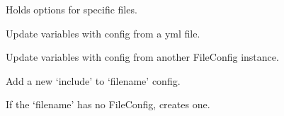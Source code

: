 \documentclass[A4paper,10pt,english]{sphinxmanual}
\begin{document}

\begin{fulllineitems}
\label{devel/code:config.FileConfig}
Holds options for specific files.

\begin{fulllineitems}
\label{devel/code:config.FileConfig.members}
\end{fulllineitems}


\begin{fulllineitems}
\label{devel/code:config.FileConfig.update}
Update variables with config from a yml file.

\end{fulllineitems}


\begin{fulllineitems}
\label{devel/code:config.FileConfig.inherit}
Update variables with config from another FileConfig instance.

\end{fulllineitems}


\begin{fulllineitems}
\label{devel/code:config.FileConfig.add_include}
Add a new `include' to `filename' config.

If the `filename' has no FileConfig, creates one.

\end{fulllineitems}


\end{fulllineitems}

\end{document}
